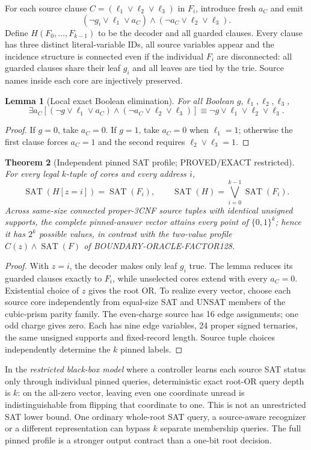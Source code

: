 \documentclass[11pt]{article}
\newtheorem{theorem}{Theorem}
\newtheorem{lemma}[theorem]{Lemma}
\newcommand{\SAT}{\operatorname{SAT}}
\begin{document}
For each source clause \(C=(\ell_1\vee\ell_2\vee\ell_3)\) in \(F_i\), introduce fresh \(a_C\) and emit
\[
(\neg g_i\vee\ell_1\vee a_C)
\wedge(\neg a_C\vee\ell_2\vee\ell_3).\tag{1}
\]
Define \(H(F_0,\ldots,F_{k-1})\) to be the decoder and all guarded clauses. Every clause has three distinct literal-variable IDs, all source variables appear and the incidence structure is connected even if the individual \(F_i\) are disconnected: all guarded clauses share their leaf \(g_i\) and all leaves are tied by the trie. Source names inside each core are injectively preserved.

\begin{lemma}[Local exact Boolean elimination]
For all Boolean \(g,\ell_1,\ell_2,\ell_3\),
\[
\exists a_C[(\neg g\vee\ell_1\vee a_C)\wedge
(\neg a_C\vee\ell_2\vee\ell_3)]
\equiv \neg g\vee\ell_1\vee\ell_2\vee\ell_3.
\]
\end{lemma}
\begin{proof}
If \(g=0\), take \(a_C=0\). If \(g=1\), take
\(a_C=0\) when \(\ell_1=1\); otherwise the first clause forces
\(a_C=1\) and the second requires \(\ell_2\vee\ell_3=1\).
\end{proof}
\begin{theorem}[Independent pinned SAT profile; PROVED/EXACT restricted]
For every legal \(k\)-tuple of cores and every address \(i\),
\[
\boxed{\SAT(H[z=i])=\SAT(F_i)},\qquad
\boxed{\SAT(H)=\bigvee_{i=0}^{k-1}\SAT(F_i)}.\tag{2}
\]
Across same-size connected proper-3CNF source tuples with identical unsigned supports, the complete pinned-answer vector attains every point of \(\{0,1\}^k\); hence it has \(2^k\) possible values, in contrast with the two-value profile \(C(z)\wedge\SAT(F)\) of BOUNDARY-ORACLE-FACTOR128.
\end{theorem}
\begin{proof}
With \(z=i\), the decoder makes only leaf \(g_i\) true. The lemma reduces its guarded clauses exactly to \(F_i\), while unselected cores extend with every \(a_C=0\). Existential choice of \(z\) gives the root OR. To realize every vector, choose each source core independently from equal-size SAT and UNSAT members of the cubic-prism parity family. The even-charge source has 16 edge assignments; one odd charge gives zero. Each has nine edge variables, 24 proper signed ternaries, the same unsigned supports and fixed-record length. Source tuple choices independently determine the \(k\) pinned labels.
\end{proof}
In the \emph{restricted black-box model} where a controller learns each source SAT status only through individual pinned queries, deterministic exact root-OR query depth is \(k\): on the all-zero vector, leaving even one coordinate unread is indistinguishable from flipping that coordinate to one. This is not an unrestricted SAT lower bound. One ordinary whole-root SAT query, a source-aware recognizer or a different representation can bypass \(k\) separate membership queries. The full pinned profile is a stronger output contract than a one-bit root decision.
\end{document}
